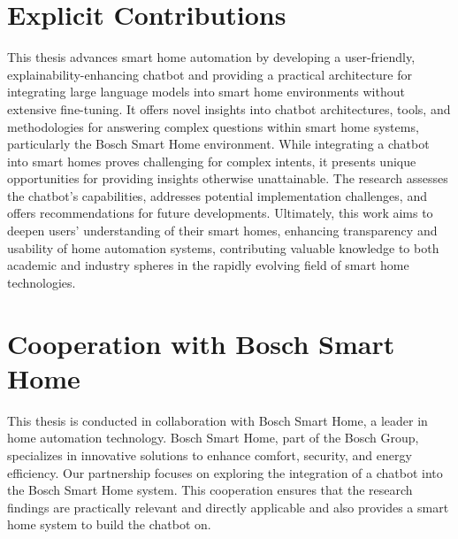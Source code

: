 \section{Explicit Contributions}
This thesis advances smart home automation by developing a user-friendly, explainability-enhancing chatbot and providing a practical architecture for integrating large language models into smart home environments without extensive fine-tuning. 
It offers novel insights into chatbot architectures, tools, and methodologies for answering complex questions within smart home systems, particularly the Bosch Smart Home environment. 
While integrating a chatbot into smart homes proves challenging for complex intents, it presents unique opportunities for providing insights otherwise unattainable. 
The research assesses the chatbot's capabilities, addresses potential implementation challenges, and offers recommendations for future developments. 
Ultimately, this work aims to deepen users' understanding of their smart homes, enhancing transparency and usability of home automation systems, contributing valuable knowledge to both academic and industry spheres in the rapidly evolving field of smart home technologies.

\section{Cooperation with Bosch Smart Home}
This thesis is conducted in collaboration with Bosch Smart Home, a leader in home automation technology. Bosch Smart Home, part of the Bosch Group, specializes in innovative solutions to enhance comfort, security, and energy efficiency.
Our partnership focuses on exploring the integration of a chatbot into the Bosch Smart Home system. This cooperation ensures that the research findings are practically relevant and directly applicable and also provides a smart home system to build the chatbot on.

\newpage
